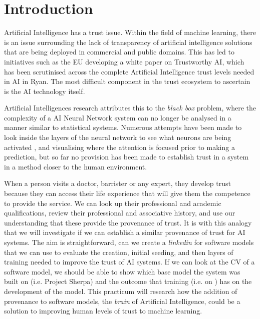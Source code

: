 \section{Introduction}
Artificial Intelligence has a trust issue. Within the field of machine learning, there is an issue surrounding the lack of transparency of artificial intelligence solutions that are being deployed in commercial and public domains. This has led to initiatives such as the EU developing a white paper on Trustworthy AI\cite{high-level_expert_group_on_ai_ethics_2019}, which has been scrutinised across the complete Artificial Intelligence trust levels needed in AI in Ryan\cite{ryan_ai_2020}. The most difficult component in the trust ecosystem to ascertain is the AI technology itself.

Artificial Intelligences research attributes this to the \textit{black box} problem\cite{adadi_peeking_2018}, where the complexity of a AI Neural Network system can no longer be analysed in a manner similar to statistical systems. Numerous attempts have been made to look inside the layers of the neural network to see what neurons are being activated \cite{kim_interpretability_2018}, and visualising where the attention is focused prior to making a prediction, but so far no provision has been made to establish trust in a system in a method closer to the human environment.

When a person visits a doctor, barrister or any expert, they develop trust because they can access their life experience that will give them the competence to provide the service. We can look up their professional and academic qualifications, review their professional and associative history, and use our understanding that these provide the provenance of trust. It is with this analogy that we will investigate if we can establish a similar provenance of trust for AI systems. The aim is straightforward, can we create a \textit{linkedin} for software models that we can use to evaluate the creation, initial seeding, and then layers of training needed to improve the trust of AI systems. If we can look at the CV of a software model, we should be able to show which base model the system was built on (i.e. Project Sherpa\cite{project_sherpa_httpswwwproject-sherpaeuethics-by-design_2019}) and the outcome that training (i.e. on \cite{deng_imagenet_2009}) has on the development of the model. This practicum will research how the addition of provenance to software models, the \textit{brain} of Artificial Intelligence, could be a solution to improving human levels of trust\cite{mcleod_trust_2020} to machine learning.

